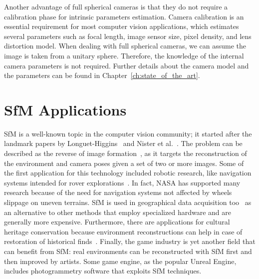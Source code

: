Another advantage of full spherical cameras is that they do not require a calibration phase for intrinsic parameters estimation. Camera calibration is an essential requirement for most computer vision applications, which estimates several parameters such as focal length, image 
sensor size, pixel density, and lens distortion model. When dealing with full spherical cameras, we can assume the image is taken from a unitary sphere. Therefore, the knowledge of the internal camera parameters is not required. 
Further details about the camera model and the parameters can be found in Chapter~\ref{ch:state_of_the_art}.

\section{SfM Applications}
SfM is a well-known topic in the computer vision community; it started after 
the landmark papers by Longuet-Higgins~\cite{longuet1981computer} and
Nister et al.~\cite{moravec1980obstacle}.
The problem can be described as the reverse of image formation~\cite{Wei2013},
as it targets the reconstruction of the environment 
and camera poses given a set of two or more images.
Some of the first application for this technology included robotic research, 
like navigation systems intended for rover
explorations~\cite{moravec1980obstacle,durrant1996localization}.
In fact, NASA has supported
many research because of the need for navigation systems not affected by wheels
slippage on uneven terrains.
SfM is used in geographical data acquisition too~\cite{fonstad2013topographic,
westoby2012structure, james2012straightforward}
as an alternative to other methods that employ specialized hardware and are generally more expensive.
Furthermore, there are applications for cultural heritage conservation because 
environment reconstructions can help in case of restoration of historical
finds~\cite{kraus2007photogrammetry}.
Finally, the game industry is yet another field that can benefit from 
SfM: real environments can be reconstructed with SfM first and then 
improved by artists. Some game engine, as the popular Unreal Engine,
includes photogrammetry software that exploits SfM techniques.
%
